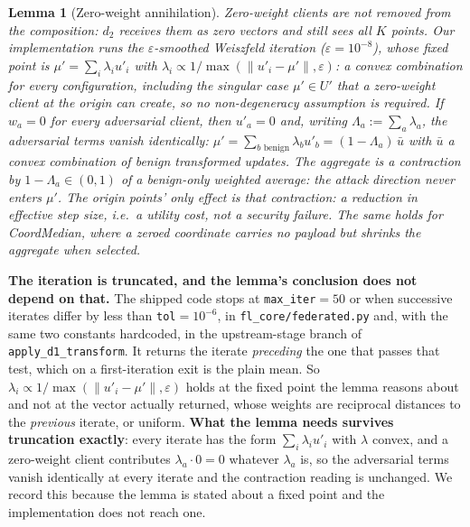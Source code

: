 \documentclass{article}
\newtheorem{lemma}{Lemma}
\begin{document}
\begin{lemma}[Zero-weight annihilation]
\label{lem:annihilation}
Zero-weight clients are \emph{not} removed from the composition: $d_2$ receives them as zero vectors and still sees all $K$ points. Our implementation runs the $\varepsilon$-smoothed Weiszfeld iteration ($\varepsilon=10^{-8}$), whose fixed point is $\mu' = \sum_i \lambda_i u'_i$ with $\lambda_i \propto 1/\max(\|u'_i-\mu'\|,\varepsilon)$: a convex combination for \emph{every} configuration, including the singular case $\mu'\in U'$ that a zero-weight client at the origin can create, so no non-degeneracy assumption is required. If $w_a = 0$ for every adversarial client, then $u'_a = 0$ and, writing $\Lambda_a := \sum_{a}\lambda_a$, the adversarial terms vanish identically:
$\mu' = \sum_{b\text{ benign}}\lambda_b u'_b = (1-\Lambda_a)\,\bar u$ with $\bar u$ a convex combination of benign transformed updates. The aggregate is a \emph{contraction by $1-\Lambda_a\in(0,1)$ of a benign-only weighted average}: the attack direction never enters $\mu'$. The origin points' only effect is that contraction: a reduction in effective step size, i.e.\ a utility cost, not a security failure. The same holds for CoordMedian, where a zeroed coordinate carries no payload but shrinks the aggregate when selected.
\end{lemma}

\noindent\textbf{The iteration is truncated, and the lemma's conclusion does not depend on that.} The shipped code stops at \texttt{max\_iter}${}={}50$ or when successive iterates differ by less than \texttt{tol}${}={}10^{-6}$, in \texttt{fl\_core/federated.py} and, with the same two constants hardcoded, in the upstream-stage branch of \texttt{apply\_d1\_transform}. It returns the iterate \emph{preceding} the one that passes that test, which on a first-iteration exit is the plain mean. So $\lambda_i \propto 1/\max(\|u'_i-\mu'\|,\varepsilon)$ holds at the fixed point the lemma reasons about and not at the vector actually returned, whose weights are reciprocal distances to the \emph{previous} iterate, or uniform. \textbf{What the lemma needs survives truncation exactly}: every iterate has the form $\sum_i \lambda_i u'_i$ with $\lambda$ convex, and a zero-weight client contributes $\lambda_a \cdot 0 = 0$ whatever $\lambda_a$ is, so the adversarial terms vanish identically at every iterate and the contraction reading is unchanged. We record this because the lemma is stated about a fixed point and the implementation does not reach one.
\end{document}
